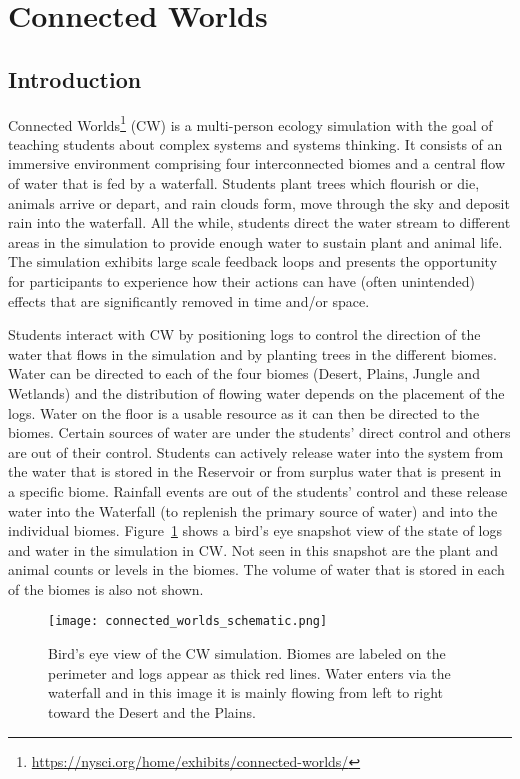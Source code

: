 \section{Connected Worlds}\label{sec:connected_worlds}


\subsection{Introduction}\label{sec:connected_worlds_intro}
Connected Worlds\footnote{\url{https://nysci.org/home/exhibits/connected-worlds/}} (CW) is a multi-person ecology simulation with the goal of teaching students about complex systems and systems thinking.  It consists of an immersive environment comprising four interconnected biomes and a central flow of water that is fed by a waterfall. Students plant trees which flourish or die, animals arrive or depart, and rain clouds form, move through the sky and deposit rain into the waterfall. All the while, students direct the water stream to different areas in the simulation to provide enough water to sustain plant and animal life. The simulation exhibits large scale feedback loops and presents the opportunity for participants to experience how their actions can have (often unintended) effects that are significantly removed in time and/or space.

Students interact with CW by positioning logs to control the direction of the water that flows in the simulation and by planting trees in the different biomes. Water can be directed to each of the four biomes (Desert, Plains, Jungle and Wetlands) and the distribution of flowing water depends on the placement of the logs. Water on the floor is a usable resource as it can then be directed to the biomes. Certain sources of water are under the students' direct control and others are out of their control. Students can actively release water into the system from the water that is stored in the Reservoir or from surplus water that is present in a specific biome. Rainfall events are out of the students' control and these release water into the Waterfall (to replenish the primary source of water) and into the individual biomes. Figure~\ref{fig:connected_worlds_graphic} shows a bird's eye snapshot view of the state of logs and water in the simulation in CW. Not seen in this snapshot are the plant and animal counts or levels in the biomes. The volume of water that is stored in each of the biomes is also not shown.

\begin{figure}
\centering
\texttt{[image: connected\_worlds\_schematic.png]}
\caption{Bird's eye view of the CW simulation. Biomes are labeled on the perimeter and logs appear as thick red lines. Water enters via the waterfall and in this image it is mainly flowing from left to right toward the Desert and the Plains.}
\label{fig:connected_worlds_graphic}
\end{figure}




